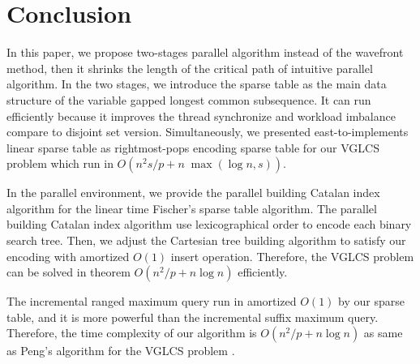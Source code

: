 \section{Conclusion}
\label{sec:Conclusion}

In this paper, we propose two-stages parallel algorithm instead of the
wavefront method, then it shrinks the length of the critical path of
intuitive parallel algorithm.  In the two stages, we introduce the
sparse table as the main data structure of the variable gapped longest
common subsequence.  It can run efficiently because it improves the
thread synchronize and workload imbalance compare to disjoint set
version.  Simultaneously, we presented east-to-implements linear sparse
table as rightmost-pops encoding sparse table for our VGLCS problem
which run in $O(n^2 s / p + n \; \max(\log n, s))$.

In the parallel environment, we provide the parallel building Catalan
index algorithm for the linear time Fischer's sparse table algorithm.
The parallel building Catalan index algorithm use lexicographical order
to encode each binary search tree.  Then, we adjust the Cartesian tree
building algorithm to satisfy our encoding with amortized $O(1)$ insert
operation.  Therefore, the VGLCS problem can be solved in theorem $O(n^2
/ p + n \log n)$ efficiently.

The incremental ranged maximum query run in amortized $O(1)$ by our
sparse table, and it is more powerful than the incremental suffix
maximum query.  Therefore, the time complexity of our algorithm is
$O(n^2 / p + n \log n)$ as same as Peng's algorithm for the VGLCS
problem .
